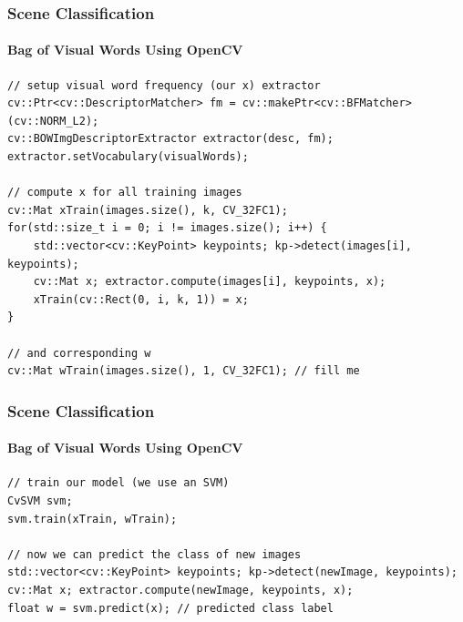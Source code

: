 \documentclass[xetex,professionalfont]{beamer}
\begin{document}

\begin{frame}[fragile]
\frametitle{Scene Classification}
\framesubtitle{Bag of Visual Words Using OpenCV}

\footnotesize

\begin{verbatim}
// setup visual word frequency (our x) extractor
cv::Ptr<cv::DescriptorMatcher> fm = cv::makePtr<cv::BFMatcher>(cv::NORM_L2);
cv::BOWImgDescriptorExtractor extractor(desc, fm);
extractor.setVocabulary(visualWords);

// compute x for all training images
cv::Mat xTrain(images.size(), k, CV_32FC1);
for(std::size_t i = 0; i != images.size(); i++) {
    std::vector<cv::KeyPoint> keypoints; kp->detect(images[i], keypoints);
    cv::Mat x; extractor.compute(images[i], keypoints, x);
    xTrain(cv::Rect(0, i, k, 1)) = x;
}

// and corresponding w
cv::Mat wTrain(images.size(), 1, CV_32FC1); // fill me
\end{verbatim}

\end{frame}


\begin{frame}[fragile]
\frametitle{Scene Classification}
\framesubtitle{Bag of Visual Words Using OpenCV}

\footnotesize

\begin{verbatim}
// train our model (we use an SVM)
CvSVM svm;
svm.train(xTrain, wTrain);

// now we can predict the class of new images
std::vector<cv::KeyPoint> keypoints; kp->detect(newImage, keypoints);
cv::Mat x; extractor.compute(newImage, keypoints, x);
float w = svm.predict(x); // predicted class label
\end{verbatim}

\end{frame}


{
\begin{frame}


\end{frame}
}
\end{document}
